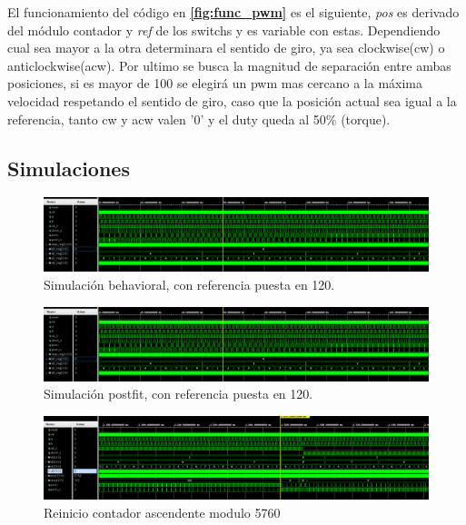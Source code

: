 \documentclass[11pt, a4paper]{article}
\begin{document}
		El funcionamiento del código en  \textcolor{blue}{\textbf{\ref{fig:func_pwm}}} es el siguiente, \textit{pos} es derivado del módulo contador y \textit{ref} de los switchs y es variable con estas. Dependiendo cual sea mayor a la otra determinara el sentido de giro, ya sea clockwise(cw) o anticlockwise(acw). Por ultimo se busca la magnitud de separación entre ambas posiciones, si es mayor de 100 se elegirá un pwm mas cercano a la máxima velocidad respetando el sentido de giro, caso que la posición actual sea igual a la referencia, tanto cw y acw valen '0' y el duty queda al 50\% (torque).

		\subsection{Simulaciones}
		\begin{figure}[H]
			\centering
			\includegraphics[width=\textwidth]{Imagenes/sim_impl_120.png}
			\caption{Simulación behavioral, con referencia puesta en 120.}
			\label{fig:sim_behav_pwm}
		\end{figure} 

		\begin{figure}[H]
			\centering
			\includegraphics[width=\textwidth]{Imagenes/sim_impl_120.png}
			\caption{Simulación postfit, con referencia puesta en 120.}
			\label{fig:sim_impl_pwm}
		\end{figure} 
		
		\begin{figure}[H]
			\centering
			\includegraphics[width=\textwidth]{Imagenes/sim_up.png}
			\caption{Reinicio contador ascendente modulo 5760}
			\label{fig:cont_up}
		\end{figure} 
		
\end{document}
